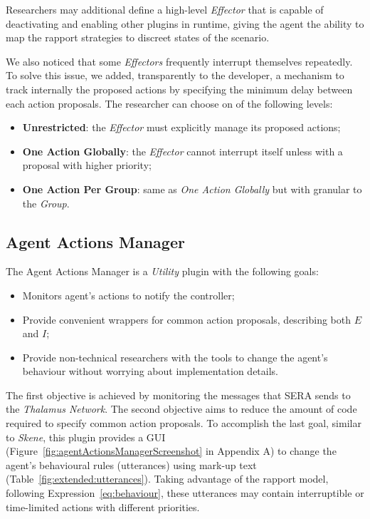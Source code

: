 Researchers may additional define a high-level \textit{Effector} that is capable of deactivating and enabling other plugins in runtime, giving the agent the ability to map the rapport strategies to discreet states of the scenario.

We also noticed that some \textit{Effectors} frequently interrupt themselves repeatedly. To solve this issue, we added, transparently to the developer, a mechanism to track internally the proposed actions by specifying the minimum delay between each action proposals. The researcher can choose on of the following levels:

\begin{itemize}
	\item \textbf{Unrestricted}: the \textit{Effector} must explicitly manage its proposed actions;
	\item \textbf{One Action Globally}: the \textit{Effector} cannot interrupt itself unless with a proposal with higher priority;
	\item \textbf{One Action Per Group}: same as \textit{One Action Globally} but with granular to the \textit{Group}.
\end{itemize}

\subsection{Agent Actions Manager}
\label{sub:sec:agentActionsManager}


The Agent Actions Manager is a \textit{Utility} plugin with the following goals:
\begin{itemize}
	\item Monitors agent's actions to notify the controller;
	\item Provide convenient wrappers for common action proposals, describing both $E$ and $I$;
	\item Provide non-technical researchers with the tools to change the agent's behaviour without worrying about implementation details.
\end{itemize}

The first objective is achieved by monitoring the messages that \ac{SERA} sends to the \textit{Thalamus Network}. The second objective aims to reduce the amount of code required to specify common action proposals. To accomplish the last goal, similar to \textit{Skene}, this plugin provides a \ac{GUI} (Figure~\ref{fig:agentActionsManagerScreenshot} in Appendix A) to change the agent's behavioural rules (utterances) using mark-up text (Table~\ref{fig:extended:utterances}). Taking advantage of the rapport model, following Expression~\ref{eq:behaviour}, these utterances may contain interruptible or time-limited actions with different priorities.

